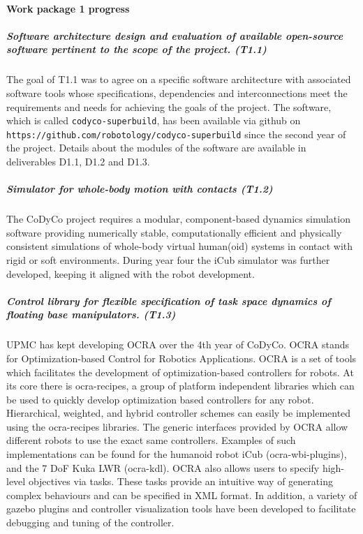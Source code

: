 

\paragraph{Work package 1 progress}

\subparagraph*{Software architecture design and evaluation of available
  open-source software pertinent to the scope of the project. (T1.1)}

The goal of T1.1 was to agree on a specific software architecture with
associated software tools whose specifications, dependencies and
interconnections meet the requirements and needs for achieving the goals of
the project.  The software, which is called \texttt{codyco-superbuild}, has
been available via github on
\texttt{https://github.com/robotology/codyco-superbuild} since the second year
of the project.  Details about the modules of the software are available in
deliverables D1.1, D1.2 and D1.3.

\subparagraph*{Simulator for whole-body motion with contacts (T1.2)}

The CoDyCo project requires a modular, component-based dynamics simulation
software providing numerically stable, computationally efficient and
physically consistent simulations of whole-body virtual human(oid) systems in
contact with rigid or soft environments.  During year four the iCub simulator
was further developed, keeping it aligned with the robot development.


\subparagraph*{Control library for flexible specification of task space
  dynamics of floating base manipulators. (T1.3)} 

UPMC has kept developing OCRA over the 4th year of CoDyCo.  OCRA stands for
Optimization-based Control for Robotics Applications.  OCRA is a set of tools
which facilitates the development of optimization-based controllers for
robots.  At its core there is ocra-recipes, a group of platform independent
libraries which can be used to quickly develop optimization based controllers
for any robot.  Hierarchical, weighted, and hybrid controller schemes can
easily be implemented using the ocra-recipes libraries.  The generic
interfaces provided by OCRA allow different robots to use the exact same
controllers.  Examples of such implementations can be found for the humanoid
robot iCub (ocra-wbi-plugins), and the 7 DoF Kuka LWR (ocra-kdl).  OCRA also
allows users to specify high-level objectives via tasks.  These tasks provide
an intuitive way of generating complex behaviours and can be specified in XML
format.  In addition, a variety of gazebo plugins and controller visualization
tools have been developed to facilitate debugging and tuning of the
controller.

